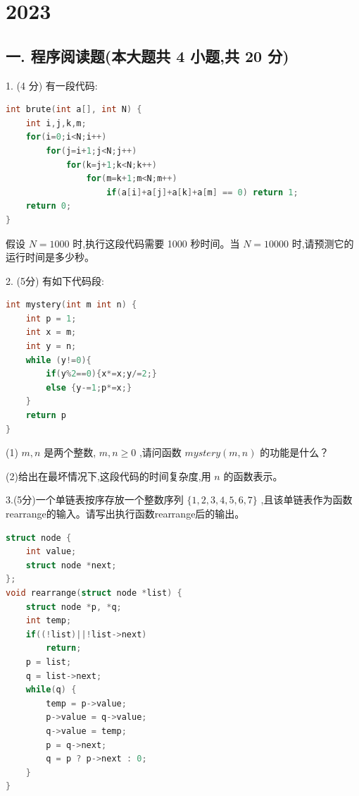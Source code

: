 \chapter{2023}
\section*{一. 程序阅读题(本大题共 4 小题,共 20 分)}

1. (4 分) 有一段代码:
\begin{lstlisting}[language=C, basicstyle=\ttfamily]
int brute(int a[], int N) {
    int i,j,k,m;
    for(i=0;i<N;i++)
        for(j=i+1;j<N;j++)
            for(k=j+1;k<N;k++)
                for(m=k+1;m<N;m++)
                    if(a[i]+a[j]+a[k]+a[m] == 0) return 1;
    return 0;
}
\end{lstlisting}

假设 \(N = {1000}\) 时,执行这段代码需要 1000 秒时间。当 \(N = {10000}\) 时,请预测它的运行时间是多少秒。
\vspace{5em}

2. (5分) 有如下代码段:
\begin{lstlisting}[language=C, basicstyle=\ttfamily]
int mystery(int m int n) {
    int p = 1;
    int x = m;
    int y = n;
    while (y!=0){
        if(y%2==0){x*=x;y/=2;}
        else {y-=1;p*=x;}
    }
    return p
}
\end{lstlisting}




(1) \(m,n\) 是两个整数, \(m,n \geq  0\) ,请问函数 \({mystery}\left( {m,n}\right)\) 的功能是什么？

(2)给出在最坏情况下,这段代码的时间复杂度,用 \(n\) 的函数表示。
\vspace{5em}

3.(5分)一个单链表按序存放一个整数序列 \(\{ 1,2,3,4,5,6,7\}\) ,且该单链表作为函数rearrange的输入。请写出执行函数rearrange后的输出。
\vspace{10em}

\begin{lstlisting}[language=C, basicstyle=\ttfamily]
struct node {
    int value;
    struct node *next;
};
void rearrange(struct node *list) {
    struct node *p, *q;
    int temp;
    if((!list)||!list->next)
        return;
    p = list;
    q = list->next;
    while(q) {
        temp = p->value;
        p->value = q->value;
        q->value = temp;
        p = q->next;
        q = p ? p->next : 0;
    }
}
\end{lstlisting}
\vspace{8em}

